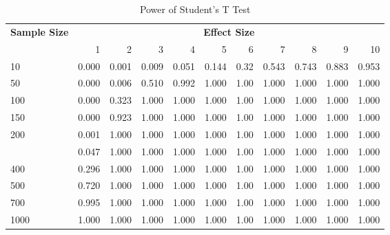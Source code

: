 \documentclass[]{article}
\begin{document}
\begin{table}

\caption{\label{tab:power-tables}Power of Student's T Test}
\centering
\begin{tabular}[t]{lrrrrrrrrrr}
\toprule
\multicolumn{ 1}{c}{\bfseries Sample Size} & \multicolumn{10}{c}{\bfseries Effect Size} \\
\cmidrule(l{2pt}r{2pt}){1-1} \cmidrule(l{2pt}r{2pt}){2-11}
  & 1 & 2 & 3 & 4 & 5 & 6 & 7 & 8 & 9 & 10\\
\midrule
10 & 0.000 & 0.001 & 0.009 & 0.051 & 0.144 & 0.32 & 0.543 & 0.743 & 0.883 & 0.953\\
50 & 0.000 & 0.006 & 0.510 & 0.992 & 1.000 & 1.00 & 1.000 & 1.000 & 1.000 & 1.000\\
100 & 0.000 & 0.323 & 1.000 & 1.000 & 1.000 & 1.00 & 1.000 & 1.000 & 1.000 & 1.000\\
150 & 0.000 & 0.923 & 1.000 & 1.000 & 1.000 & 1.00 & 1.000 & 1.000 & 1.000 & 1.000\\
200 & 0.001 & 1.000 & 1.000 & 1.000 & 1.000 & 1.00 & 1.000 & 1.000 & 1.000 & 1.000\\
\addlinespace
300 & 0.047 & 1.000 & 1.000 & 1.000 & 1.000 & 1.00 & 1.000 & 1.000 & 1.000 & 1.000\\
400 & 0.296 & 1.000 & 1.000 & 1.000 & 1.000 & 1.00 & 1.000 & 1.000 & 1.000 & 1.000\\
500 & 0.720 & 1.000 & 1.000 & 1.000 & 1.000 & 1.00 & 1.000 & 1.000 & 1.000 & 1.000\\
700 & 0.995 & 1.000 & 1.000 & 1.000 & 1.000 & 1.00 & 1.000 & 1.000 & 1.000 & 1.000\\
1000 & 1.000 & 1.000 & 1.000 & 1.000 & 1.000 & 1.00 & 1.000 & 1.000 & 1.000 & 1.000\\
\bottomrule
\end{tabular}
\end{table}
\end{document}
